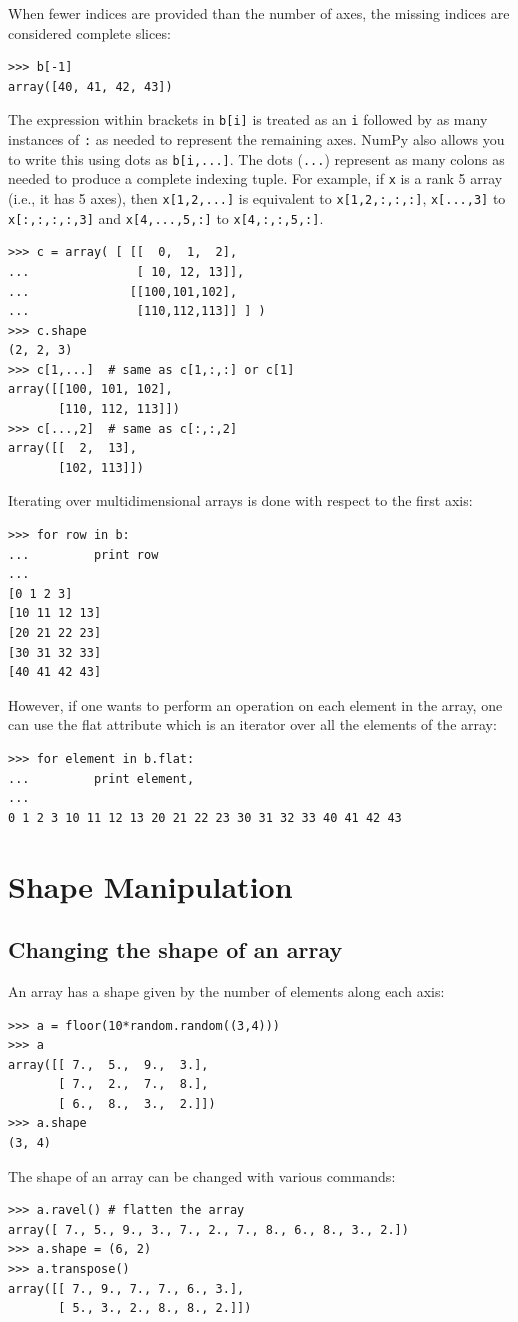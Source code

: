 \documentclass[12pt]{article}
\begin{document}
When fewer indices are provided than the number of axes, the missing indices are considered complete slices:
\footnotesize
\begin{Verbatim}[frame=single]
>>> b[-1]   
array([40, 41, 42, 43])
\end{Verbatim}
\normalsize
The expression within brackets in \texttt{b[i]} is treated as an \texttt{i} followed by as many instances of \texttt{:} as needed to represent the remaining axes. NumPy also allows you to write this using dots as \texttt{b[i,...]}.
The dots (\texttt{...}) represent as many colons as needed to produce a complete indexing tuple. For example, if {\tt x} is a rank 5 array (i.e., it has 5 axes), then
\texttt{x[1,2,...]} is equivalent to \texttt{x[1,2,:,:,:]},
\texttt{x[...,3]} to \texttt{x[:,:,:,:,3]} and
\texttt{x[4,...,5,:]} to \texttt{x[4,:,:,5,:]}.
\footnotesize
\begin{Verbatim}[frame=single]
>>> c = array( [ [[  0,  1,  2], 
...               [ 10, 12, 13]],
...              [[100,101,102],
...               [110,112,113]] ] )
>>> c.shape
(2, 2, 3)
>>> c[1,...]  # same as c[1,:,:] or c[1]
array([[100, 101, 102],
       [110, 112, 113]])
>>> c[...,2]  # same as c[:,:,2]
array([[  2,  13],
       [102, 113]])
\end{Verbatim}
\normalsize
Iterating over multidimensional arrays is done with respect to the first axis:
\footnotesize
\begin{Verbatim}[frame=single]
>>> for row in b:
...         print row
...
[0 1 2 3]
[10 11 12 13]
[20 21 22 23]
[30 31 32 33]
[40 41 42 43]
\end{Verbatim}
\normalsize
However, if one wants to perform an operation on each element in the array, one can use the flat attribute which is an iterator over all the elements of the array:
\footnotesize
\begin{Verbatim}[frame=single]
>>> for element in b.flat:
...         print element,
...
0 1 2 3 10 11 12 13 20 21 22 23 30 31 32 33 40 41 42 43
\end{Verbatim}
\normalsize

\section{Shape Manipulation}
\subsection{Changing the shape of an array}
An array has a shape given by the number of elements along each axis:
\footnotesize
\begin{Verbatim}[frame=single]
>>> a = floor(10*random.random((3,4)))
>>> a
array([[ 7.,  5.,  9.,  3.],
       [ 7.,  2.,  7.,  8.],
       [ 6.,  8.,  3.,  2.]])
>>> a.shape
(3, 4)
\end{Verbatim}
\normalsize
The shape of an array can be changed with various commands:
\footnotesize
\begin{Verbatim}[frame=single]
>>> a.ravel() # flatten the array
array([ 7., 5., 9., 3., 7., 2., 7., 8., 6., 8., 3., 2.])
>>> a.shape = (6, 2)
>>> a.transpose()
array([[ 7., 9., 7., 7., 6., 3.],
       [ 5., 3., 2., 8., 8., 2.]])
\end{Verbatim}
\normalsize
\end{document}
